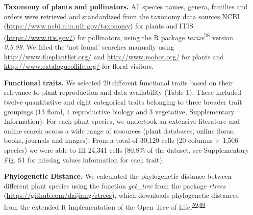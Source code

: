 \documentclass[
  12pt,
  a4paper,
]{article}
\begin{document}
\textbf{Taxonomy of plants and pollinators.} All species names, genera, families and orders were retrieved and standardized from the taxonomy data sources NCBI (\url{https://www.ncbi.nlm.nih.gov/taxonomy}) for plants and ITIS (\url{https://www.itis.gov/}) for pollinators, using the R package \emph{taxize}\textsuperscript{\protect\hyperlink{ref-chamberlain2020}{58}} version \emph{0.9.99}. We filled the `not found' searches manually using \url{http://www.theplantlist.org/} and \url{http://www.mobot.org/} for plants and \url{http://www.catalogueoflife.org/} for floral visitors.

\textbf{Functional traits.} We selected 20 different functional traits based on their relevance to plant reproduction and data availability (Table 1). These included twelve quantitative and eight categorical traits belonging to three broader trait groupings (13 floral, 4 reproductive biology and 3 vegetative, Supplementary Information). For each plant species, we undertook an extensive literature and online search across a wide range of resources (plant databases, online floras, books, journals and images). From a total of 30,120 cells (20 columns × 1,506 species) we were able to fill 24,341 cells (80.8\% of the dataset, see Supplementary Fig. S1 for missing values information for each trait).

\textbf{Phylogenetic Distance.} We calculated the phylogenetic distance between different plant species using the function \emph{get\_tree} from the package \emph{rtrees} (\url{https://github.com/daijiang/rtrees}), which downloads phylogenetic distances from the extended R implementation of the Open Tree of Life.\textsuperscript{\protect\hyperlink{ref-smith2018}{59},\protect\hyperlink{ref-jin2019}{60}}

\singlespacing
\end{document}
